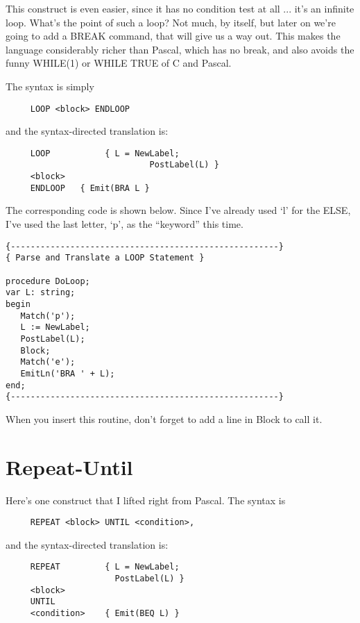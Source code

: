 This construct is even easier, since it has no condition  test at all  ... it's an infinite loop. What's the point of such a loop?  Not much, by  itself, but  later  on  we're going to add a BREAK command, that  will  give us a way out. This makes the language considerably richer than Pascal, which  has  no  break, and also avoids the funny  WHILE(1) or WHILE TRUE of C and Pascal.

The syntax is simply

\begin{verbatim}
     LOOP <block> ENDLOOP
\end{verbatim}

and the syntax-directed translation is:

\begin{verbatim}
     LOOP           { L = NewLabel;
                             PostLabel(L) }
     <block>
     ENDLOOP   { Emit(BRA L }
\end{verbatim}

The corresponding code is shown below. Since  I've  already used `l'  for  the  ELSE, I've used  the  last  letter, `p', as  the ``keyword'' this time.

\begin{verbatim}
{------------------------------------------------------}
{ Parse and Translate a LOOP Statement }

procedure DoLoop;
var L: string;
begin
   Match('p');
   L := NewLabel;
   PostLabel(L);
   Block;
   Match('e');
   EmitLn('BRA ' + L);
end;
{------------------------------------------------------}
\end{verbatim}

When you insert this routine, don't forget to add a line in Block to call it.

\section{Repeat-Until}

Here's one construct that I lifted right from Pascal. The syntax is

\begin{verbatim}
     REPEAT <block> UNTIL <condition>,
\end{verbatim}

and the syntax-directed translation is:

\begin{verbatim}
     REPEAT         { L = NewLabel;
                      PostLabel(L) }
     <block>
     UNTIL
     <condition>    { Emit(BEQ L) }
\end{verbatim}

